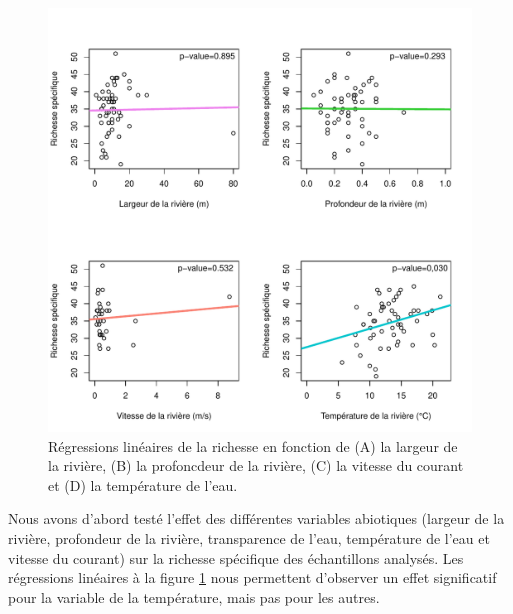 \documentclass[9pt,twocolumn,twoside,]{pnas-new}
\begin{document}
\begin{figure}
\centering
\includegraphics{regression_richesse.pdf}
\caption{Régressions linéaires de la richesse en fonction de (A) la
largeur de la rivière, (B) la profoncdeur de la rivière, (C) la vitesse
du courant et (D) la température de l'eau.
\label{fig:regression_richesse}}
\end{figure}

Nous avons d'abord testé l'effet des différentes variables abiotiques
(largeur de la rivière, profondeur de la rivière, transparence de l'eau,
température de l'eau et vitesse du courant) sur la richesse spécifique
des échantillons analysés. Les régressions linéaires à la figure
\ref{fig:regression_richesse} nous permettent d'observer un effet
significatif pour la variable de la température, mais pas pour les
autres.
\end{document}
